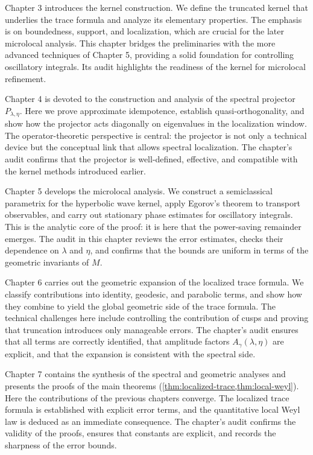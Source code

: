 Chapter 3 introduces the kernel construction. We define the truncated kernel
that underlies the trace formula and analyze its elementary properties. The
emphasis is on boundedness, support, and localization, which are crucial for
the later microlocal analysis. This chapter bridges the preliminaries with the
more advanced techniques of Chapter 5, providing a solid foundation for
controlling oscillatory integrals. Its audit highlights the readiness of the
kernel for microlocal refinement.

Chapter 4 is devoted to the construction and analysis of the spectral projector
$P_{\lambda,\eta}$. Here we prove approximate idempotence, establish
quasi-orthogonality, and show how the projector acts diagonally on eigenvalues
in the localization window. The operator-theoretic perspective is central: the
projector is not only a technical device but the conceptual link that allows
spectral localization. The chapter’s audit confirms that the projector is
well-defined, effective, and compatible with the kernel methods introduced
earlier.

Chapter 5 develops the microlocal analysis. We construct a semiclassical
parametrix for the hyperbolic wave kernel, apply Egorov’s theorem to transport
observables, and carry out stationary phase estimates for oscillatory
integrals. This is the analytic core of the proof: it is here that the
power-saving remainder emerges. The audit in this chapter reviews the error
estimates, checks their dependence on $\lambda$ and $\eta$, and confirms that
the bounds are uniform in terms of the geometric invariants of $M$.

Chapter 6 carries out the geometric expansion of the localized trace formula.
We classify contributions into identity, geodesic, and parabolic terms, and
show how they combine to yield the global geometric side of the trace formula.
The technical challenges here include controlling the contribution of cusps and
proving that truncation introduces only manageable errors. The chapter’s audit
ensures that all terms are correctly identified, that amplitude factors
$A_\gamma(\lambda,\eta)$ are explicit, and that the expansion is consistent
with the spectral side.

Chapter 7 contains the synthesis of the spectral and geometric analyses and
presents the proofs of the main theorems
(\cref{thm:localized-trace,thm:local-weyl}). Here the contributions of the
previous chapters converge. The localized trace formula is established with
explicit error terms, and the quantitative local Weyl law is deduced as an
immediate consequence. The chapter’s audit confirms the validity of the proofs,
ensures that constants are explicit, and records the sharpness of the error
bounds.

